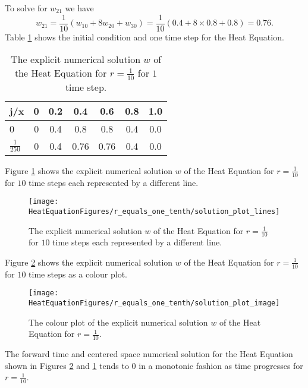 \begin{example}
To solve for $w_{21}$ we have
\[w_{21}=\frac{1}{10}(w_{10}+8w_{20}+w_{30})=\frac{1}{10}(0.4+8\times 0.8+0.8)=0.76. \]
Table \ref{Table_FTCS_1_10} shows the initial condition and one time step for the Heat Equation.
\begin{center}
 \begin{table}[H]
 \caption{The explicit numerical solution $w$ of the Heat Equation for $r=\frac{1}{10}$ for $1$ time step.}
 \label{Table_FTCS_1_10}
 \centering
\begin{tabular}{l|cccccc}
j/x&0&0.2&0.4&0.6&0.8&1.0\\ \hline
0&0&0.4&0.8&0.8&0.4&0.0\\
$\frac{1}{250}$&0&0.4&0.76&0.76&0.4&0.0
\end{tabular}
\end{table}
\end{center}

Figure \ref{Plot_FTCS_1_10} shows the explicit numerical solution $w$ of the Heat Equation for $r=\frac{1}{10}$ for $10$ time steps each represented by a different line. 
\begin{figure}[H]
  \caption{The explicit numerical solution $w$ of the Heat Equation for $r=\frac{1}{10}$ for $10$ time steps each represented by a different line.}
  \centering
    \texttt{[image: HeatEquationFigures/r\_equals\_one\_tenth/solution\_plot\_lines]}
        \label{Plot_FTCS_1_10}

\end{figure}
Figure \ref{Color_FTCS_1_10} shows the explicit numerical solution $w$ of the Heat Equation for $r=\frac{1}{10}$ for $10$ time steps as a colour plot. 

\begin{figure}[H]
  \caption{The colour plot of the explicit numerical solution $w$ of the Heat Equation for $r=\frac{1}{10}$.}
  \centering
    \texttt{[image: HeatEquationFigures/r\_equals\_one\_tenth/solution\_plot\_image]}
    \label{Color_FTCS_1_10}
\end{figure}
The forward time and centered space numerical solution for the Heat Equation shown in Figures \ref{Color_FTCS_1_10} and  \ref{Plot_FTCS_1_10} tends to $0$ in a monotonic fashion as time progresses for $r=\frac{1}{10}$. 
\end{example}
